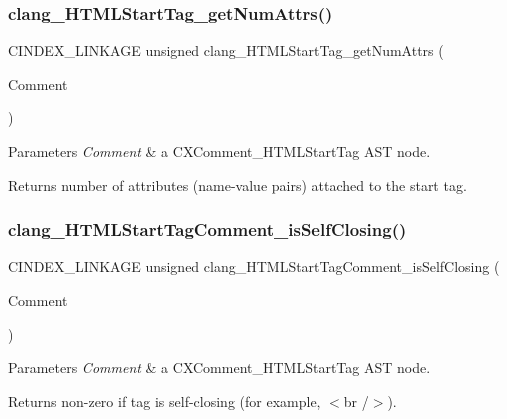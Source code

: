 \subsubsection{\texorpdfstring{clang\+\_\+\+H\+T\+M\+L\+Start\+Tag\+\_\+get\+Num\+Attrs()}{clang\_HTMLStartTag\_getNumAttrs()}}
{\footnotesize\ttfamily C\+I\+N\+D\+E\+X\+\_\+\+L\+I\+N\+K\+A\+GE unsigned clang\+\_\+\+H\+T\+M\+L\+Start\+Tag\+\_\+get\+Num\+Attrs (\begin{DoxyParamCaption}\item[{\hyperlink{structCXComment}{C\+X\+Comment}}]{Comment }\end{DoxyParamCaption})}


\begin{DoxyParams}{Parameters}
{\em Comment} & a {\ttfamily C\+X\+Comment\+\_\+\+H\+T\+M\+L\+Start\+Tag} A\+ST node.\\
\hline
\end{DoxyParams}
\begin{DoxyReturn}{Returns}
number of attributes (name-\/value pairs) attached to the start tag. 
\end{DoxyReturn}
\mbox{\label{group__CINDEX__COMMENT_ga052be5f208a0ef2f76e3e9923a96ef19}} 
\subsubsection{\texorpdfstring{clang\+\_\+\+H\+T\+M\+L\+Start\+Tag\+Comment\+\_\+is\+Self\+Closing()}{clang\_HTMLStartTagComment\_isSelfClosing()}}
{\footnotesize\ttfamily C\+I\+N\+D\+E\+X\+\_\+\+L\+I\+N\+K\+A\+GE unsigned clang\+\_\+\+H\+T\+M\+L\+Start\+Tag\+Comment\+\_\+is\+Self\+Closing (\begin{DoxyParamCaption}\item[{\hyperlink{structCXComment}{C\+X\+Comment}}]{Comment }\end{DoxyParamCaption})}


\begin{DoxyParams}{Parameters}
{\em Comment} & a {\ttfamily C\+X\+Comment\+\_\+\+H\+T\+M\+L\+Start\+Tag} A\+ST node.\\
\hline
\end{DoxyParams}
\begin{DoxyReturn}{Returns}
non-\/zero if tag is self-\/closing (for example, $<$br /$>$). 
\end{DoxyReturn}
\mbox{\label{group__CINDEX__COMMENT_ga684a46f5993fe907016aba5dbe9d1d9e}} 
